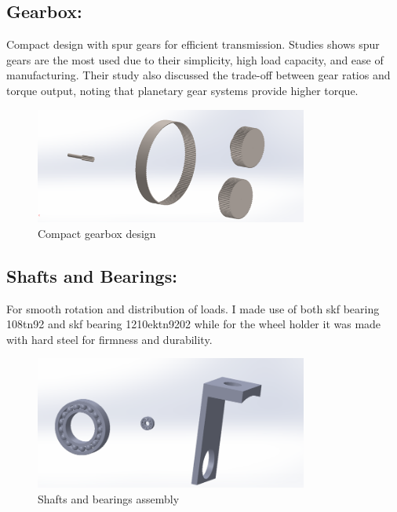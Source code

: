 \documentclass[../../main]{subfiles}
\begin{document}
\subsection{Gearbox:}
Compact design with spur gears for efficient transmission.
Studies shows spur gears are the most used due to their simplicity, high
load capacity, and ease of manufacturing. Their study also discussed the
trade-off between gear ratios and torque output, noting that planetary
gear systems provide higher torque.
\begin{figure}[h]
  \centering
  \includegraphics[width=0.8\textwidth]{sublatex/Opryrmi/media/image3.png} 
  \caption{Compact gearbox design}
\end{figure}

\subsection{Shafts and Bearings:} 
For smooth rotation and distribution of loads.
I made use of both skf bearing 108tn92 and skf bearing 1210ektn9202
while for the wheel holder it was made with hard steel for firmness and
durability.
\begin{figure}[h]
  \centering
  \includegraphics[width=0.8\textwidth]{sublatex/Opryrmi/media/image4.png} 
  \caption{Shafts and bearings assembly}
\end{figure}
\end{document}
